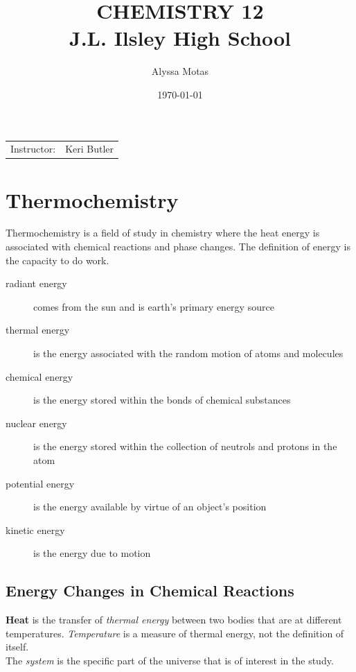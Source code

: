 \documentclass[11pt]{article}
\title{CHEMISTRY 12 \\ J.L. Ilsley High School}
\author{Alyssa Motas}
\date{\today}
\begin{document}
    \maketitle

    \begin{center}
        \begin{tabular}{l r}
            Instructor: & Keri Butler
        \end{tabular}
    \end{center}

    \section{Thermochemistry}

    Thermochemistry is a field of study in chemistry where the heat energy is associated with chemical reactions and phase changes. The definition of energy is the capacity to do work.

    \begin{description}
        \item[radiant energy]
        comes from the sun and is earth's primary energy source 
        \item[thermal energy]
        is the energy associated with the random motion of atoms and molecules
        \item[chemical energy]
        is the energy stored within the bonds of chemical substances
        \item[nuclear energy]
        is the energy stored within the collection of neutrols and protons in the atom
        \item[potential energy]
        is the energy available by virtue of an object's position
        \item[kinetic energy]     
        is the energy due to motion
    \end{description}

    \subsection{Energy Changes in Chemical Reactions}
    \textbf{Heat} is the transfer of \textit{thermal energy} between two bodies that are at different temperatures. \textit{Temperature} is a measure of thermal energy, not the definition of itself. \\

    The \textit{system} is the specific part of the universe that is of interest in the study.
\end{document}
